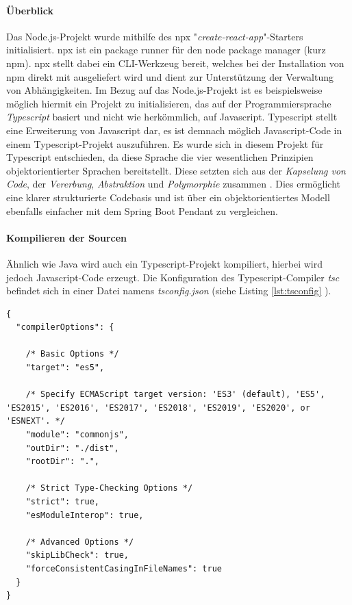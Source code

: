 \paragraph{Überblick}
Das Node.js-Projekt wurde mithilfe des npx "\emph{create-react-app}"-Starters initialisiert. npx ist ein package runner für den node package manager (kurz npm). npx stellt dabei ein CLI-Werkzeug bereit, welches bei der Installation von npm direkt mit ausgeliefert wird und dient zur Unterstützung der Verwaltung von Abhängigkeiten. Im Bezug auf das Node.js-Projekt ist es beispielsweise möglich hiermit ein Projekt zu initialisieren, das auf der Programmiersprache \emph{Typescript} basiert und nicht wie herkömmlich, auf Javascript. Typescript stellt eine Erweiterung von Javascript dar, es ist demnach möglich Javascript-Code in einem Typescript-Projekt auszuführen. Es wurde sich in diesem Projekt für Typescript entschieden, da diese Sprache die vier wesentlichen Prinzipien objektorientierter Sprachen bereitstellt. Diese setzten sich aus der \emph{Kapselung von Code}, der \emph{Vererbung}, \emph{Abstraktion} und \emph{Polymorphie} zusammen \cite{typescript-oop}. Dies ermöglicht eine klarer strukturierte Codebasis und ist über ein objektorientiertes Modell ebenfalls einfacher mit dem Spring Boot Pendant zu vergleichen.

\paragraph{Kompilieren der Sourcen}
Ähnlich wie Java wird auch ein Typescript-Projekt kompiliert, hierbei wird jedoch Javascript-Code erzeugt. Die Konfiguration des Typescript-Compiler \emph{tsc} befindet sich in einer Datei namens \emph{tsconfig.json} (siehe Listing \ref{lst:tsconfig} ).

\newpage

\begin{lstlisting}[style=javaStyle,caption={tsconfig.json},label=lst:tsconfig]
  {
  "compilerOptions": {

    /* Basic Options */
    "target": "es5",

    /* Specify ECMAScript target version: 'ES3' (default), 'ES5', 'ES2015', 'ES2016', 'ES2017', 'ES2018', 'ES2019', 'ES2020', or 'ESNEXT'. */
    "module": "commonjs",
    "outDir": "./dist",
    "rootDir": ".",

    /* Strict Type-Checking Options */
    "strict": true,
    "esModuleInterop": true,

    /* Advanced Options */
    "skipLibCheck": true,
    "forceConsistentCasingInFileNames": true
  }
}

\end{lstlisting}

